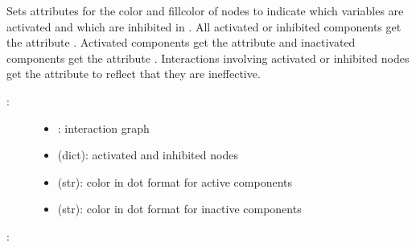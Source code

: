 \documentclass[letterpaper,10pt,english]{sphinxmanual}
\begin{document}
\begin{fulllineitems}
\label{\detokenize{InteractionGraphs:PyBoolNet.InteractionGraphs.add_style_activities}}
Sets attributes for the color and fillcolor of nodes to indicate which variables are activated and which are inhibited in .
All activated or inhibited components get the attribute .
Activated components get the attribute  and
inactivated components get the attribute .
Interactions involving activated or inhibited nodes get the attribute  to reflect that they are ineffective.
\begin{description}
\item[{:}] \leavevmode\begin{itemize}
\item {} 
: interaction graph

\item {} 
 (dict): activated and inhibited nodes

\item {} 
 (str): color in dot format for active components

\item {} 
 (str): color in dot format for inactive components

\end{itemize}

\end{description}

:

\begin{sphinxVerbatim}[commandchars=\\\{\}]
   
 
\end{sphinxVerbatim}

\end{fulllineitems}
\end{document}
